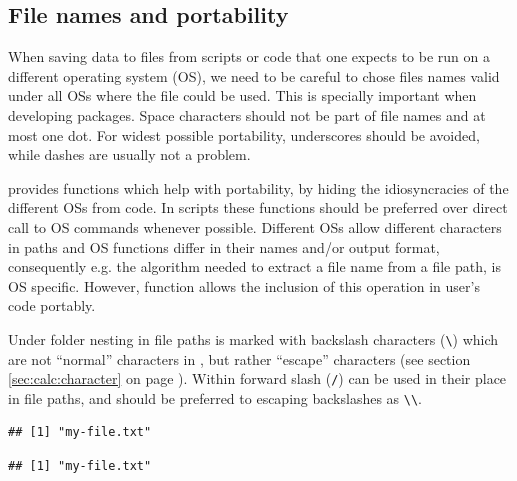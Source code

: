 \documentclass[krantz2]{krantz}\usepackage{knitr}%
\begin{document}
\subsection{File names and portability}\label{sec:files:filenames}

When saving data to files from scripts or code that one expects to be run on a different operating system (OS), we need to be careful to chose files names valid under all OSs where the file could be used. This is specially important when developing \Rlang packages. Space characters should not be part of file names and at most one dot. For widest possible portability, underscores should be avoided, while dashes are usually not a problem.

\Rlang provides functions which help with portability, by hiding the idiosyncracies of the different OSs from \Rlang code. In scripts these functions should be preferred over direct call to OS commands whenever possible. Different OSs allow different characters in paths and OS functions differ in their names and/or output format, consequently e.g. the algorithm needed to extract a file name from a file path, is OS specific. However, \Rlang function  allows the inclusion of this operation in user's code portably.

Under  folder nesting in file paths is marked with backslash characters (\verb|\|) which are not ``normal'' characters in \Rlang, but rather ``escape'' characters (see section \ref{sec:calc:character} on page \pageref{sec:calc:character}). Within \Rlang forward slash (\verb|/|) can be used in their place in file paths, and should be preferred to escaping backslashes as \verb|\\|.

\begin{knitrout}\footnotesize
{}\color{fgcolor}\begin{kframe}
\begin{alltt}
\hlstd{(}\hlstd{)}
\end{alltt}
\begin{verbatim}
## [1] "my-file.txt"
\end{verbatim}
\begin{alltt}
\hlstd{(}\hlstd{)}
\end{alltt}
\begin{verbatim}
## [1] "my-file.txt"
\end{verbatim}
\end{kframe}
\end{knitrout}
\end{document}
